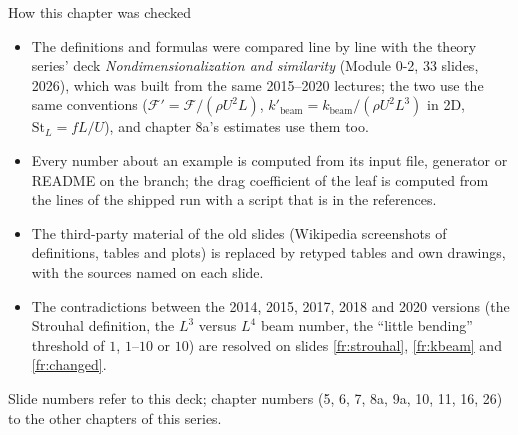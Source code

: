\documentclass[aspectratio=169,11pt]{beamer}
\begin{document}
\begin{frame}{How this chapter was checked}
\label{fr:checked}
\begin{itemize}\footnotesize
  \item The definitions and formulas were compared line by line with the theory series' deck \emph{Nondimensionalization and similarity} (Module 0-2, 33 slides, 2026), which was built from the same 2015--2020 lectures; the two use the same conventions ($\mathcal{F}' = \mathcal{F}/(\rho U^2 L)$, $k'_{\mathrm{beam}} = k_{\mathrm{beam}}/(\rho U^2L^3)$ in 2D, $\mathrm{St}_L = fL/U$), and chapter 8a's estimates use them too.
  \item Every number about an example is computed from its input file, generator or README on the  branch; the drag coefficient of the leaf is computed from the  lines of the shipped run with a script that is in the references.
  \item The third-party material of the old slides (Wikipedia screenshots of definitions, tables and plots) is replaced by retyped tables and own drawings, with the sources named on each slide.
  \item The contradictions between the 2014, 2015, 2017, 2018 and 2020 versions (the Strouhal definition, the $L^3$ versus $L^4$ beam number, the ``little bending'' threshold of $1$, $1$--$10$ or $10$) are resolved on slides \ref{fr:strouhal}, \ref{fr:kbeam} and \ref{fr:changed}.
\end{itemize}
\vspace{1mm}
\begin{punchbox}
\small Slide numbers refer to this deck; chapter numbers (5, 6, 7, 8a, 9a, 10, 11, 16, 26) to the other chapters of this series.
\end{punchbox}
\end{frame}
\end{document}
